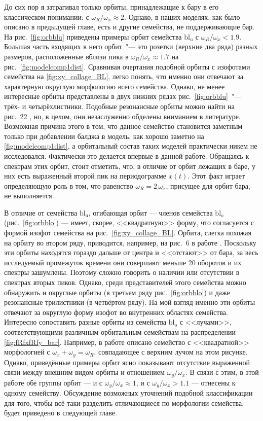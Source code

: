 \documentclass[tikz]{trlnotes}
\begin{document}
До сих пор я затрагивал только орбиты, принадлежащие к бару в его классическом понимании: с $ω_R/ω_x \approx 2$.
Однако, в наших моделях, как было описано в предыдущей главе, есть и другие семейства, не поддерживающие бар.
На рис.~\ref{fig:orbblu} приведены примеры орбит семейства $\text{bl}_{\text{u}}$ с $ω_R/ω_x < 1.9$. Большая часть 
входящих в него орбит~"--- это розетки (верхние два ряда) разных размеров, расположенные вблизи пика в $ω_R/ω_x \approx 1.7$ на рис.~\ref{fig:modelcomp1dist}.
Сравнивая очертания подобной орбиты с изофотами семейства на \ref{fig:xy_collage_BL}, легко понять, что именно они отвечают
за характерную округлую морфологию всего семейства. Однако, не менее интересные орбиты представлены в двух нижних рядах рис.~\ref{fig:orbblu}~"--- трёх- и четырёхлистники. Подобные резонансные орбиты можно найти на рис.~22 \citet{voglis2007}, но, в целом, они незаслуженно обделены вниманием в литературе.
Возможная причина этого в том, что данное семейство становится заметным только при добавлении балджа в модель, как хорошо
заметно на \ref{fig:modelcomp1dist}, а орбитальный состав таких моделей практически никем не исследовался. Фактически это делается впервые в данной работе. 
Обращаясь к спектрам этих орбит, стоит отметить, что, в отличие от орбит лежащих в баре, у них есть выраженный второй пик на периодограмме $x(t)$. Этот факт играет определяющую роль в том, что  равенство $ω_R = 2\,ω_x$, присущее для орбит бара, не выполняется.

В отличие от семейства $\text{bl}_{\text{u}}$, огибающая орбит --- членов семейства $\text{bl}_{\text{o}}$ (рис.~\ref{fig:orbblo}) --- 
имеет, скорее, <<квадратную>> форму, что согласуется с формой изофот семейства на рис.~\ref{fig:xy_collage_BL}. Орбита, слегка похожая на орбиту во втором ряду, приводится, например, на рис.~6 в работе \cite{gajda2016}. Поскольку эти орбиты находятся
гораздо дальше от центра и <<отстают>> от бара, за весь исследуемый промежуток времени они совершают меньше 20 оборотов и их спектры зашумлены. Поэтому сложно говорить о наличии или отсутствии в спектрах вторых пиков. Однако, среди представителей этого семейства можно обнаружить и округлые орбиты (в третьем ряду рис.~\ref{fig:orbblo}) и даже резонансные трилистники (в четвёртом ряду). 
На мой взгляд именно эти орбиты отвечают за округлую форму изофот во внутренних областях семейства. 
Интересно сопоставить разные орбиты из семейства $\text{bl}_\text{o}$ с <<лучами>>, соответствующими различным орбитальным семействам на распределении \ref{fig:fRfxfRfy_bar}. 
Например, в работе \cite{gajda2016} описано семейство с <<квадратной>> морфологией с $ω_x + ω_y = ω_R$, совпадающее с верхним 
лучом на этом рисунке. Однако, приведённые примеры орбит ясно показывают отсутствие выраженной связи между внешним видом орбиты и отношением $ω_y/ω_x$.
В связи с этим, в этой работе обе группы орбит --- и с $ω_y/ω_x \approx 1$, и с $ω_y/ω_x > 1.1$ --- отнесены к одному семейству. 
Обсуждение возможных уточнений подобной классификации для того, 
чтобы всё-таки разделить отличающиеся по морфологии семейства, будет приведено в следующей главе.
\end{document}
